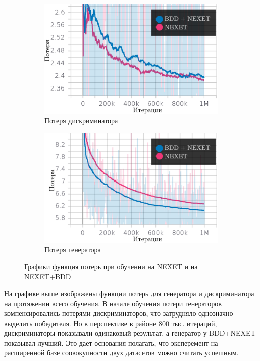 \documentclass[11pt,a4paper]{extarticle}
\begin{document}
{				\begin{figure}[ht]
					\centering
					\begin{subfigure}[ht]{0.45\textwidth}
						\includegraphics[width=\textwidth]{img/nexet_bdd_dis}
						\caption{Потеря дискриминатора}
					\end{subfigure}
					\begin{subfigure}[ht]{0.45\textwidth}
						\includegraphics[width=\textwidth]{img/nexet_bdd_gen}
						\caption{Потеря генератора}
					\end{subfigure}
					\caption{Графики функция потерь при обучении на NEXET и на NEXET+BDD}
					\label{pic:nexet_bdd}
				\end{figure}
				\noindent
				На графике выше изображены функции потерь для генератора и дискриминатора на протяжении всего обучения.
				В начале обучения потери генераторов компенсировались потерями дискриминаторов, что затрудняло однозначно выделить победителя.
				Но в перспективе в районе 800 тыс. итераций, дискриминаторы показывали одинаковый результат, а генератор у BDD+NEXET показывал лучший.
				Это дает основания полагать, что эксперемент на расширенной базе соовокупности двух датасетов можно считать успешным.
				

}
\end{document}
